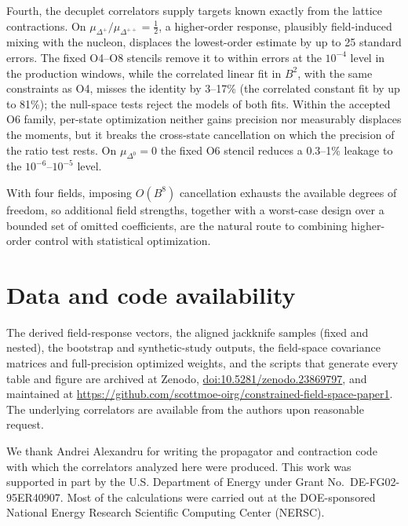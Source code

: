 \documentclass[aps,prd,preprint,nofootinbib,floatfix]{revtex4-2}
\begin{document}
Fourth, the decuplet correlators supply targets known exactly from the lattice contractions. On $\mu_{\Delta^+}/\mu_{\Delta^{++}}=\tfrac12$, a higher-order response, plausibly field-induced mixing with the nucleon, displaces the lowest-order estimate by up to 25 standard errors. The fixed O4--O8 stencils remove it to within errors at the $10^{-4}$ level in the production windows, while the correlated linear fit in $B^2$, with the same constraints as O4, misses the identity by 3--17\% (the correlated constant fit by up to 81\%); the null-space tests reject the models of both fits. Within the accepted O6 family, per-state optimization neither gains precision nor measurably displaces the moments, but it breaks the cross-state cancellation on which the precision of the ratio test rests. On $\mu_{\Delta^0}=0$ the fixed O6 stencil reduces a 0.3--1\% leakage to the $10^{-6}$--$10^{-5}$ level.

With four fields, imposing $O(B^8)$ cancellation exhausts the available degrees of freedom, so additional field strengths, together with a worst-case design over a bounded set of omitted coefficients, are the natural route to combining higher-order control with statistical optimization.

\section*{Data and code availability}

The derived field-response vectors, the aligned jackknife samples (fixed and nested), the bootstrap and synthetic-study outputs, the field-space covariance matrices and full-precision optimized weights, and the scripts that generate every table and figure are archived at Zenodo, \href{https://doi.org/10.5281/zenodo.23869797}{doi:10.5281/zenodo.23869797}, and maintained at \url{https://github.com/scottmoe-oirg/constrained-field-space-paper1}. The underlying correlators are available from the authors upon reasonable request.

\begin{acknowledgments}
We thank Andrei Alexandru for writing the propagator and contraction code with which the correlators analyzed here were produced. This work was supported in part by the U.S. Department of Energy under Grant No.~DE-FG02-95ER40907. Most of the calculations were carried out at the DOE-sponsored National Energy Research Scientific Computing Center (NERSC).
\end{acknowledgments}
\end{document}
